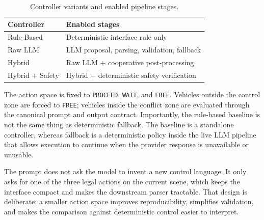 \documentclass[letterpaper,10pt,conference]{ieeeconf}
\begin{document}
\begin{table}[t]

\centering

\caption{Controller variants and enabled pipeline stages.}

\label{tab:controllers}

\renewcommand{\arraystretch}{1.08}

\begin{tabular}{p{1.75cm} p{3.5cm}}

\toprule

\textbf{Controller} & \textbf{Enabled stages} \\

\midrule

Rule-Based & Deterministic interface rule only \\

Raw LLM & LLM proposal, parsing, validation, fallback \\

Hybrid & Raw LLM + cooperative post-processing \\

Hybrid + Safety & Hybrid + deterministic safety verification \\

\bottomrule

\end{tabular}

\end{table}



The action space is fixed to \texttt{PROCEED}, \texttt{WAIT}, and \texttt{FREE}. Vehicles outside the control zone are forced to \texttt{FREE}; vehicles inside the conflict zone are evaluated through the canonical prompt and output contract. Importantly, the rule-based baseline is not the same thing as deterministic fallback. The baseline is a standalone controller, whereas fallback is a deterministic policy inside the live LLM pipeline that allows execution to continue when the provider response is unavailable or unusable.



The prompt does not ask the model to invent a new control language. It only asks for one of the three legal actions on the current scene, which keeps the interface compact and makes the downstream parser tractable. That design is deliberate: a smaller action space improves reproducibility, simplifies validation, and makes the comparison against deterministic control easier to interpret.
\end{document}
